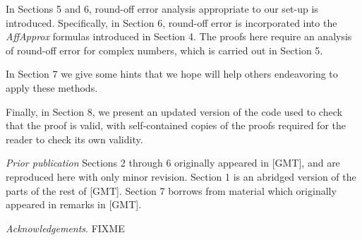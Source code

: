 In Sections 5 and 6, round-off error analysis appropriate to our 
set-up is introduced.  Specifically, in Section 6, round-off error is 
incorporated 
into the {\it AffApprox} formulas introduced in Section 4.  The proofs here 
require an analysis of round-off error for complex numbers, which is carried 
out in Section 5.

In Section 7 we give some hints that we hope will help
others endeavoring to apply these methods.

Finally, in Section 8, we present an updated version of
the code used to check that the proof is valid,
with self-contained copies of the proofs required for the reader
to check its own validity.

{\it Prior publication}
Sections 2 through 6 originally appeared in [GMT],
and are reproduced here with only minor revision.
Section 1 is an abridged version of the parts of the rest of [GMT].
Section 7 borrows from material which originally appeared in remarks in [GMT].

{\it Acknowledgements}.
FIXME
